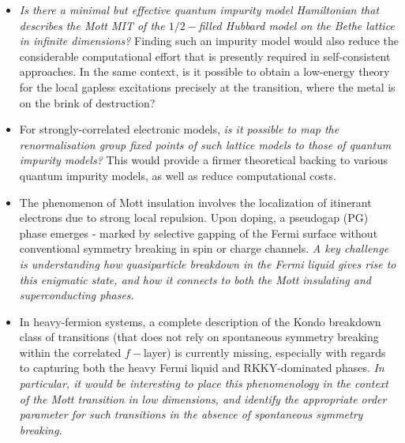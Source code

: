 \begin{itemize}
	\item {\it Is there a minimal but effective quantum impurity model Hamiltonian that describes the Mott MIT of the $1/2-$filled Hubbard model on the Bethe lattice in infinite dimensions?} Finding such an impurity model would also reduce the considerable computational effort that is presently required in self-consistent approaches. In the same context, is it possible to obtain a low-energy theory for the local gapless excitations precisely at the transition, where the metal is on the brink of destruction?
	\item For strongly-correlated electronic models, {\it is it possible to map the renormalisation group fixed points of such lattice models to those of quantum impurity models?} This would provide a firmer theoretical backing to various quantum impurity models, as well as reduce computational costs. 
	\item The phenomenon of Mott insulation involves the localization of itinerant electrons due to strong local repulsion. Upon doping, a pseudogap (PG) phase emerges - marked by selective gapping of the Fermi surface without conventional symmetry breaking in spin or charge channels. {\it A key challenge is understanding how quasiparticle breakdown in the Fermi liquid gives rise to this enigmatic state, and how it connects to both the Mott insulating and superconducting phases.}
	\item In heavy-fermion systems, a complete description of the Kondo breakdown class of transitions (that does not rely on spontaneous symmetry breaking within the correlated \(f-\)layer) is currently missing, especially with regards to capturing both the heavy Fermi liquid and RKKY-dominated phases. {\it In particular, it would be interesting to place this phenomenology in the context of the Mott transition in low dimensions, and identify the appropriate order parameter for such transitions in the absence of spontaneous symmetry breaking.}
\end{itemize}

